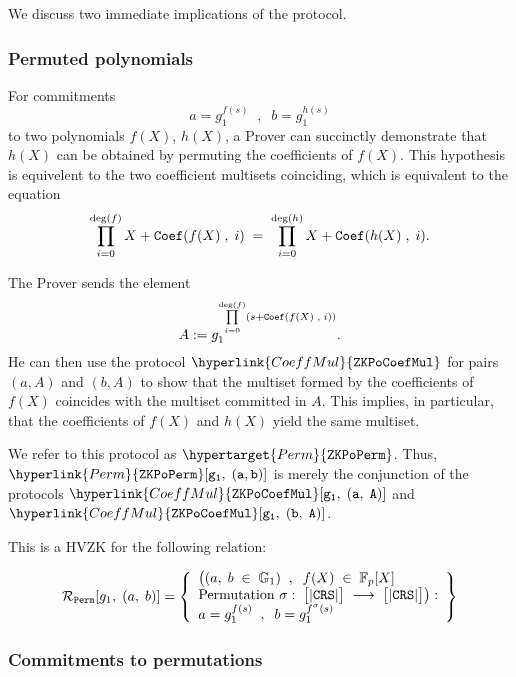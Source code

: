 \documentclass[11pt, lettersize, notitlepage, leqno, footskip=0.6cm]{article}
\newcommand{\bFp}{\mathbb{F}_p}
\newcommand{\lra}{\longrightarrow}
\newcommand{\mc}{\mathcal}
\newcommand{\mb}{\mathbb}
\newcommand{\vs}{\vspace{-0.15cm}}
\newcommand{\noin}{\noindent}
\numberwithin{equation}{section}
\begin{document}
\vspace{2mm}

\noin We discuss two immediate implications of the protocol. \vspace{2mm}

\subsubsection{\fontsize{11}{11}\selectfont Permuted polynomials}



For commitments $$ a = g_1^{f(s)}\;\;,\;\;  b = g_1^{h(s)}  $$ to two polynomials $f(X)$, $h(X)$, a Prover can succinctly demonstrate that $h(X)$ can be obtained by permuting the coefficients of $f(X)$. This hypothesis is equivelent to the two coefficient multisets coinciding, which is equivalent to the equation \vs $$ \prod\limits_{i=0}^{\deg(f)} X+{\tt{Coef}}(f(X)\;,\;i) \; = \; \prod\limits_{i=0}^{\deg(h)}  X + {\tt{Coef}}(h(X)\;,\;i).   $$

\noin The Prover sends the element \vs $$ A:=  g_1^{\prod\limits_{i=0}^{\deg(f)} (s+{\tt{Coef}}(f(X)\;,\;i))}. $$ He can then use the protocol $\hyperlink{CoeffMul}{\tt{ZKPoCoefMul}}$ for pairs $(a, A)$ and $(b, A)$ to show that the multiset formed by the coefficients of $f(X)$ coincides with the multiset committed in $A$. This implies, in particular, that the coefficients of $f(X)$ and $h(X)$ yield the same multiset. 

We refer to this protocol as $\hypertarget{Perm}{\tt{ZKPoPerm}}$. Thus, $\hyperlink{Perm}{\tt{ZKPoPerm}}[g_1,\;(a,b)]$ is merely the conjunction of the protocols $\hyperlink{CoeffMul}{\tt{ZKPoCoefMul}}[g_1,\;(a,\;A)]$ and $\hyperlink{CoeffMul}{\tt{ZKPoCoefMul}}[g_1,\;(b,\;A)]$.

This is a HVZK for the following relation:

\vs $$\mc{R}_{\tt{Perm}}[g_1,\;(a,\;b)] = \left\{\begin{array}{l} \big((a,\;  b\;\in\;\mb{G}_1)\;\;,\;\; f(X)\; \in \;\bFp[X]\\

\text{Permutation }\sigma:\;\big[|{\tt{CRS}}|\big]\;\lra\; \big[|{\tt{CRS}}|\big]  \big) :\\

a = g_1^{f(s)}\;\;,\;\;b = g_1^{f^{\sigma}(s)}

\end{array}\right\}  $$



\subsubsection{\fontsize{11}{11}\selectfont Commitments to permutations}
\end{document}
